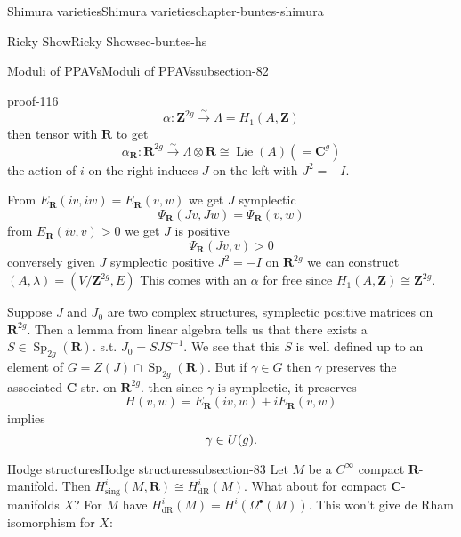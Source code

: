 \documentclass[oneside,10pt,]{book}
\renewcommand{\qedhere}{\relax}
\numberwithin{equation}{section}
\newcommand{\Lie}{\operatorname{Lie}}
\newcommand{\cinf}{C^\infty}
\newcommand{\inv}{^{-1}}
\newcommand{\ZZ}{\mathbf{Z}}
\newcommand{\RR}{\mathbf{R}}
\newcommand{\CC}{\mathbf{C}}
\newcommand{\dR}{\mathrm{dR}}
\DeclareMathOperator{\Sp}{Sp}
\newcommand{\gt}{>}
\begin{document}
\begin{chapterptx}{Shimura varieties}{}{Shimura varieties}{}{}{chapter-buntes-shimura}
\begin{sectionptx}{Ricky Show}{}{Ricky Show}{}{}{sec-buntes-hs}
\begin{subsectionptx}{Moduli of PPAVs}{}{Moduli of PPAVs}{}{}{subsection-82}
\begin{proofptx}{}{proof-116}
\begin{equation*}
\alpha\colon \ZZ^{2g} \xrightarrow \sim \Lambda = H_1(A,\ZZ)
\end{equation*}
then  tensor with \(\RR\) to get%
\begin{equation*}
\alpha_\RR \colon \RR^{2g} \xrightarrow\sim \Lambda\otimes \RR \cong \Lie(A) (= \CC^g)
\end{equation*}
the action of \(i\) on the right induces \(J\) on the left with \(J^2 = -I\).%
\par
\hypertarget{p-1135}{}%
From \(E_\RR(iv,iw) = E_\RR(v,w)\) we get \(J \) symplectic%
\begin{equation*}
\Psi_\RR(Jv, Jw) = \Psi_\RR( v,w)
\end{equation*}
from \(E_\RR(iv,v) \gt 0\) we get \(J\) is positive%
\begin{equation*}
\Psi_\RR(Jv,v) \gt 0
\end{equation*}
conversely given \(J\) symplectic positive \(J^2 = -I\) on \(\RR^{2g}\) we can construct \((A,\lambda) = (V/\ZZ^{2g}, E)\) This comes with an \(\alpha\) for free since \(H_1(A, \ZZ) \cong \ZZ^{2g}\).%
\par
\hypertarget{p-1136}{}%
Suppose \(J\) and \(J_0\) are two complex structures, symplectic positive matrices on \(\RR^{2g}\). Then a lemma from linear algebra tells us that there exists a \(S \in \Sp_{2g}(\RR)\). s.t. \(J_0  = S J S \inv\). We see that this \(S\) is well defined up to an element of \(G = Z(J) \cap \Sp_{2g}(\RR)\). But if \(\gamma \in G \) then \(\gamma\) preserves the associated \(\CC\)-str. on \(\RR^{2g}\). then since \(\gamma\) is symplectic, it preserves%
\begin{equation*}
H(v,w) = E_\RR(iv,w) + iE_\RR(v,w)
\end{equation*}
implies%
\begin{equation*}
\gamma \in U(g)\text{.}\qedhere
\end{equation*}
%
\end{proofptx}
\end{subsectionptx}
%
%
\typeout{************************************************}
\typeout{************************************************}
%
\begin{subsectionptx}{Hodge structures}{}{Hodge structures}{}{}{subsection-83}
\hypertarget{p-1137}{}%
Let \(M\) be a \(\cinf\) compact \(\RR\)-manifold. Then \(H^i_{\mathrm{sing}}(M, \RR)  \cong H^i_\dR(M)\). What about for compact \(\CC\)-manifolds \(X\)? For \(M\) have \(H^i_\dR(M)  = H^i(\Omega^\bullet (M))\). This won't give de Rham isomorphism for \(X\):%

\end{subsectionptx}
\end{sectionptx}
\end{chapterptx}
\end{document}
